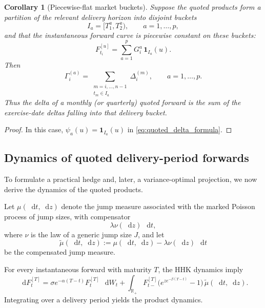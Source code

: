 \documentclass[10pt,a4paper,reqno]{amsart}
\newcommand{\<}{\langle}
\renewcommand{\>}{\rangle}
\newtheorem{corollary}[theorem]{Corollary}
\theoremstyle{example}
\newcommand*\D{\mathop{}\!\mathrm{d}}
\begin{document}
\begin{corollary}[Piecewise-flat market buckets]
\label{cor:piecewise_flat_bucket_delta}
Suppose the quoted products form a partition of the relevant delivery horizon into disjoint buckets
\[
I_a=[T_1^a,T_2^a), \qquad a=1,\dots,p,
\]
and that the instantaneous forward curve is piecewise constant on these buckets:
\[
F_{t_i}^{[u]}
=
\sum_{a=1}^p G_i^a\,\mathbf{1}_{I_a}(u).
\]
Then
\begin{equation}
\label{eq:bucket_sum_delta}
\Gamma_i^{(a)}
=
\sum_{\substack{m=i,\dots,n-1\\ t_m \in I_a}}
\Delta_i^{(m)},
\qquad a=1,\dots,p.
\end{equation}
Thus the delta of a monthly (or quarterly) quoted forward is the sum of the exercise-date deltas falling
into that delivery bucket.
\end{corollary}

\begin{proof}
In this case, $\psi_a(u)=\mathbf{1}_{I_a}(u)$ in \eqref{eq:quoted_delta_formula}.
\end{proof}

\subsection{Dynamics of quoted delivery-period forwards}

To formulate a practical hedge and, later, a variance-optimal projection, we now derive the dynamics
of the quoted products.

Let $\mu(\D t,\D z)$ denote the jump measure associated with the marked Poisson process of jump sizes,
with compensator
\[
\lambda \nu(\D z)\,\D t,
\]
where $\nu$ is the law of a generic jump size $J$, and let
\[
\widetilde{\mu}(\D t,\D z)
:=
\mu(\D t,\D z)-\lambda\nu(\D z)\,\D t
\]
be the compensated jump measure.

For every instantaneous forward with maturity $T$, the HHK dynamics imply
\begin{equation}
\label{eq:instant_forward_prm}
\D F_t^{[T]}
=
\sigma e^{-\alpha(T-t)}F_t^{[T]}\,\D W_t
+
\int_{\mathbb{R}_+}
F_{t-}^{[T]}\Big(e^{z e^{-\beta(T-t)}}-1\Big)\,\widetilde{\mu}(\D t,\D z).
\end{equation}
Integrating over a delivery period yields the product dynamics.
\end{document}

